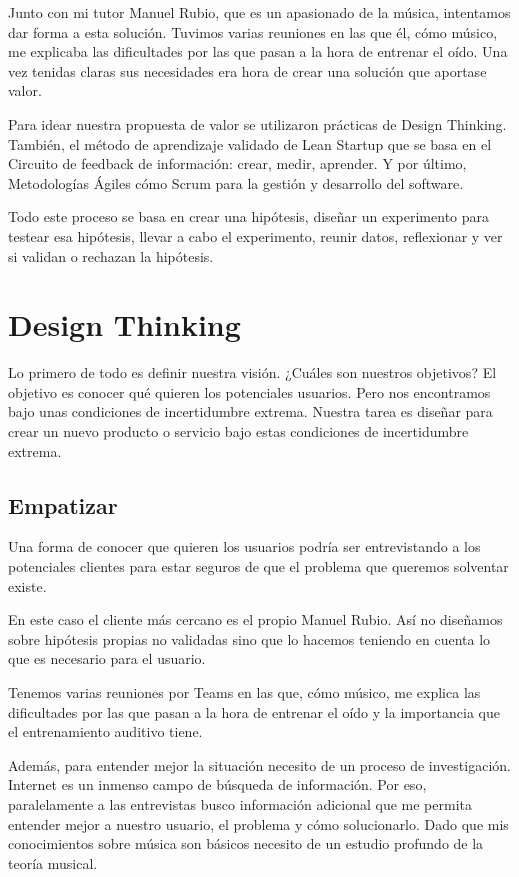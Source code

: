 \documentclass[12pt,twoside,titlepage]{report}
\begin{document}
Junto con mi tutor Manuel Rubio, que es un apasionado de la música, intentamos dar forma a esta solución. Tuvimos varias reuniones en las que él, cómo músico, me explicaba las dificultades por las que pasan a la hora de entrenar el oído. Una vez tenidas claras sus necesidades era hora de crear una solución que aportase valor.

Para idear nuestra propuesta de valor se utilizaron prácticas de Design Thinking. También, el método de aprendizaje validado de Lean Startup que se basa en el Circuito de feedback de información: crear, medir, aprender. Y por último, Metodologías Ágiles cómo Scrum para la gestión y desarrollo del software.

Todo este proceso se basa en crear una hipótesis, diseñar un experimento para testear esa hipótesis, llevar a cabo el experimento, reunir datos, reflexionar y ver si validan o rechazan la hipótesis.

\section{Design Thinking}
\label{sec:DesignThinking}
Lo primero de todo es definir nuestra visión. ¿Cuáles son nuestros objetivos? El objetivo es conocer qué quieren los potenciales usuarios. Pero nos encontramos bajo unas condiciones de incertidumbre extrema. Nuestra tarea es diseñar para crear un nuevo producto o servicio bajo estas condiciones de incertidumbre extrema.

\subsection{Empatizar}

Una forma de conocer que quieren los usuarios podría ser entrevistando a los potenciales clientes para estar seguros de que el problema que queremos solventar existe.

En este caso el cliente más cercano es el propio Manuel Rubio. Así no diseñamos sobre hipótesis propias no validadas sino que lo hacemos teniendo en cuenta lo que es necesario para el usuario.

Tenemos varias reuniones por Teams en las que, cómo músico, me explica las dificultades por las que pasan a la hora de entrenar el oído y la importancia que el entrenamiento auditivo tiene.

Además, para entender mejor la situación necesito de un proceso de investigación. Internet es un inmenso campo de búsqueda de información. Por eso, paralelamente a las entrevistas busco información adicional que me permita entender mejor a nuestro usuario, el problema y cómo solucionarlo. Dado que mis conocimientos sobre música son básicos necesito de un estudio profundo de la teoría musical. 
\end{document}

